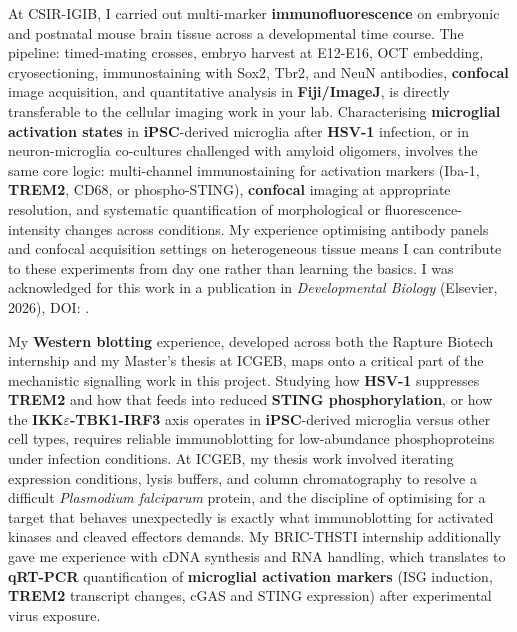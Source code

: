 \documentclass[letterpaper,11pt]{article}
\newcommand{\myuline}[1]{%
  \uline{\phantom{#1}}%
  \llap{\contour{white}{#1}}%
}
\begin{document}
\vspace{6pt}
At CSIR-IGIB, I carried out multi-marker \textbf{immunofluorescence} on embryonic and postnatal mouse brain tissue across a developmental time course. The pipeline: timed-mating crosses, embryo harvest at E12-E16, OCT embedding, cryosectioning, immunostaining with Sox2, Tbr2, and NeuN antibodies, \textbf{confocal} image acquisition, and quantitative analysis in \textbf{Fiji/ImageJ}, is directly transferable to the cellular imaging work in your lab. Characterising \textbf{microglial activation states} in \textbf{iPSC}-derived microglia after \textbf{HSV-1} infection, or in neuron-microglia co-cultures challenged with amyloid oligomers, involves the same core logic: multi-channel immunostaining for activation markers (Iba-1, \textbf{TREM2}, CD68, or phospho-STING), \textbf{confocal} imaging at appropriate resolution, and systematic quantification of morphological or fluorescence-intensity changes across conditions. My experience optimising antibody panels and confocal acquisition settings on heterogeneous tissue means I can contribute to these experiments from day one rather than learning the basics. I was acknowledged for this work in a publication in \textit{Developmental Biology} (Elsevier, 2026), DOI: \href{https://doi.org/10.1016/j.ydbio.2026.02.012}{\myuline{10.1016/j.ydbio.2026.02.012}}.

\vspace{6pt}
My \textbf{Western blotting} experience, developed across both the Rapture Biotech internship and my Master's thesis at ICGEB, maps onto a critical part of the mechanistic signalling work in this project. Studying how \textbf{HSV-1} suppresses \textbf{TREM2} and how that feeds into reduced \textbf{STING phosphorylation}, or how the \textbf{IKK$\varepsilon$-TBK1-IRF3} axis operates in \textbf{iPSC}-derived microglia versus other cell types, requires reliable immunoblotting for low-abundance phosphoproteins under infection conditions. At ICGEB, my thesis work involved iterating expression conditions, lysis buffers, and column chromatography to resolve a difficult \textit{Plasmodium falciparum} protein, and the discipline of optimising for a target that behaves unexpectedly is exactly what immunoblotting for activated kinases and cleaved effectors demands. My BRIC-THSTI internship additionally gave me experience with cDNA synthesis and RNA handling, which translates to \textbf{qRT-PCR} quantification of \textbf{microglial activation markers} (ISG induction, \textbf{TREM2} transcript changes, cGAS and STING expression) after experimental virus exposure.
\end{document}
